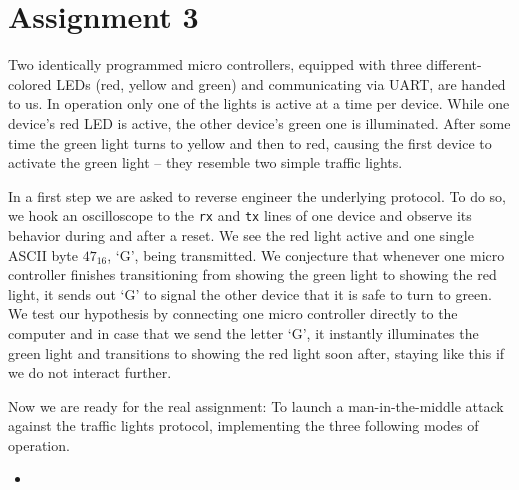 \section*{Assignment 3}



Two identically programmed micro controllers, equipped with three different-colored LEDs (red, yellow and green) and communicating via UART, are handed to us. 
In operation only one of the lights is active at a time per device. 
While one device's red LED is active, the other device's green one is illuminated. 
After some time the green light turns to yellow and then to red, causing the first device to activate the green light -- they resemble two simple traffic lights. 

In a first step we are asked to reverse engineer the underlying protocol. 
To do so, we hook an oscilloscope to the \texttt{rx} and \texttt{tx} lines of one device and observe its behavior during and after a reset. 
We see the red light active and one single ASCII byte $47_{16}$, `G', being transmitted. 
We conjecture that  whenever one micro controller finishes transitioning from showing the green light to showing the red light, it sends out `G' to signal the other device that it is safe to turn to green. 
We test our hypothesis by connecting one micro controller directly to the computer and in case that we send the letter `G', it instantly illuminates the green light and transitions to showing the red light soon after, staying like this if we do not interact further.

Now we are ready for the real assignment: To launch a man-in-the-middle attack against the traffic lights protocol, implementing the three following modes of operation.

\begin{itemize}
    \item[] 
\end{itemize}


